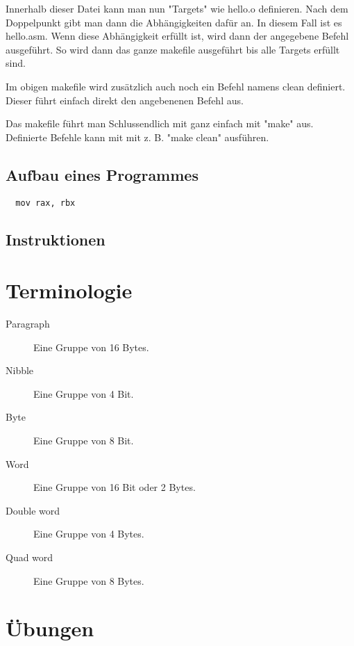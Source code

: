 \documentclass[12pt, a4paper, oneside]{article}
\begin{document}
Innerhalb dieser Datei kann man nun "Targets" wie hello.o definieren. Nach dem Doppelpunkt gibt man dann die Abhängigkeiten dafür an. In diesem Fall ist es hello.asm. Wenn diese Abhängigkeit erfüllt ist, wird dann der angegebene Befehl ausgeführt. So wird dann das ganze makefile ausgeführt bis alle Targets erfüllt sind.

Im obigen makefile wird zusätzlich auch noch ein Befehl namens clean definiert. Dieser führt einfach direkt den angebenenen Befehl aus.

Das makefile führt man Schlussendlich mit ganz einfach mit "make" aus. Definierte Befehle kann mit mit z. B. "make clean" ausführen.

\subsection{Aufbau eines Programmes}
\begin{verbatim}
  mov rax, rbx
\end{verbatim}

\subsection{Instruktionen}





\newpage
\section{Terminologie}
\begin{description}
  \item[Paragraph] Eine Gruppe von 16 Bytes.
  \item[Nibble] Eine Gruppe von 4 Bit.
  \item[Byte] Eine Gruppe von 8 Bit.
  \item[Word] Eine Gruppe von 16 Bit oder 2 Bytes.
  \item[Double word] Eine Gruppe von 4 Bytes.
  \item[Quad word] Eine Gruppe von 8 Bytes.
\end{description}

\newpage
\section{Übungen}
\end{document}
